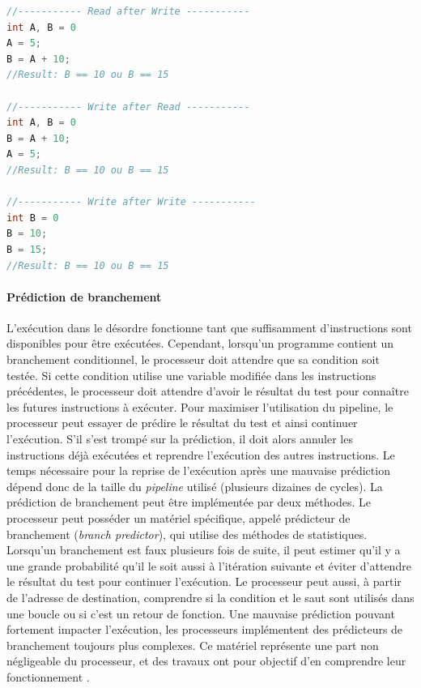 \begin{lstlisting}[language=C, caption=Exemples de dépendances entre deux instructions., float,floatplacement=H, label=code_dependances]
//----------- Read after Write -----------
int A, B = 0
A = 5;
B = A + 10;
//Result: B == 10 ou B == 15

//----------- Write after Read -----------
int A, B = 0
B = A + 10;
A = 5;
//Result: B == 10 ou B == 15 
 
//----------- Write after Write -----------
int B = 0
B = 10;
B = 15;
//Result: B == 10 ou B == 15
\end{lstlisting}






\paragraph{Prédiction de branchement}\label{sec:branch_predictor}
L'exécution dans le désordre fonctionne tant que suffisamment d'instructions sont disponibles pour être exécutées. Cependant, lorsqu'un programme contient un branchement conditionnel, le processeur doit attendre que sa condition soit testée. Si cette condition utilise une variable modifiée dans les instructions précédentes, le processeur doit attendre d'avoir le résultat du test pour connaître les futures instructions à exécuter. Pour maximiser l'utilisation du pipeline, le processeur peut essayer de prédire le résultat du test et ainsi continuer l'exécution. S'il s'est trompé sur la prédiction, il doit alors annuler les instructions déjà exécutées et reprendre l'exécution des autres instructions. Le temps nécessaire pour la reprise de l'exécution après une mauvaise prédiction dépend donc de la taille du \textit{pipeline} utilisé (plusieurs dizaines de cycles).
La prédiction de branchement peut être implémentée par deux méthodes.
Le processeur peut posséder un matériel spécifique, appelé prédicteur de branchement (\textit{branch predictor}), qui utilise des méthodes de statistiques. Lorsqu’un branchement est faux plusieurs fois de suite, il peut estimer qu'il y a une grande probabilité qu'il le soit aussi à l’itération suivante et éviter d’attendre le résultat du test pour continuer l’exécution. Le processeur peut aussi, à partir de l'adresse de destination, comprendre si la condition et le saut sont utilisés dans une boucle ou si c'est un retour de fonction. Une mauvaise prédiction pouvant fortement impacter l'exécution, les processeurs implémentent des prédicteurs de branchement toujours plus complexes. Ce matériel représente une part non négligeable du processeur, et des travaux ont pour objectif d'en comprendre leur fonctionnement \cite{Milenkovic2002}.
